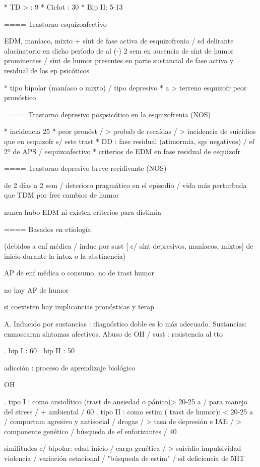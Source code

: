 * TD > : 9%
* Ciclot : 30%
* Bip II: 5-13%

==== Trastorno esquizoafectivo

EDM, maníaco, mixto + sínt de fase activa de esquizofrenia / sd delirante alucinatorio en dicho período de al (-) 2 sem en ausencia de sínt de humor prominentes / sínt de humor presentes en parte sustancial de fase activa y residual de los ep psicóticos

* tipo bipolar (maníaco o mixto) / tipo depresivo
* a > terreno esquizofr peor pronóstico

==== Trastorno depresivo pospsicótico en la esquizofrenia (NOS)

* incidencia 25%
* peor pronóst / > probab de recaídas / > incidencia de suicidios que en esquizofr s/ este trast
* DD : fase residual (atimormia, sgs negativos) / ef 2º de APS / esquizoafectivo
* criterios de EDM en fase residual de esquizofr

==== Trastorno depresivo breve recidivante (NOS)

de 2 días a 2 sem / deterioro pragmático en el episodio / vida más perturbada que TDM por frec cambios de humor

nunca hubo EDM ni existen criterios para distimia

==== Basados en etiología

(debidos a enf médica / induc por sust [ c/ sínt depresivos, maníacos, mixtos] de inicio durante la intox o la abstinencia)

AP de enf médica o consumo, no de trast humor

no hay AF de humor

si coexisten hay implicancias pronósticas y terap

A. Inducido por sustancias : diagnóstico doble es lo más adecuado.
Sustancias: enmascaran síntomas afectivos.
Abuso de OH / sust : resistencia al tto

. bip I : 60 %
. bip II : 50%

adicción : proceso de aprendizaje biológico

OH

. tipo I : como ansiolítico (trast de ansiedad o pánico)> 20-25 a / para manejo del stress / + ambiental / 60%
. tipo II : como estim ( trast de humor): < 20-25 a / comportam agresivo y antisocial / drogas / > tasa de depresión e IAE / > componente genético / búsqueda de ef euforizantes / 40%

similitudes c/ bipolar: edad inicio / carga genética / > suicidio impulsividad violencia / variación estacional / "búsqueda de estím" / sd deficiencia de 5HT


